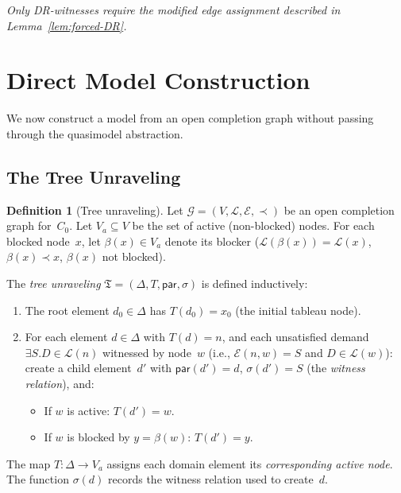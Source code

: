 \documentclass[a4paper,11pt]{article}
\theoremstyle{definition}
\newtheorem{definition}[theorem]{Definition}
\begin{document}
\emph{Only DR-witnesses require the modified edge assignment described
in Lemma~\ref{lem:forced-DR}.}


\section{Direct Model Construction}
\label{sec:model-construction}

We now construct a model from an open completion graph without passing
through the quasimodel abstraction.

\subsection{The Tree Unraveling}

\begin{definition}[Tree unraveling]
\label{def:unraveling}
Let $\mathcal{G} = (V, \mathcal{L}, \mathcal{E}, \prec)$ be an open
completion graph for~$C_0$.  Let $V_a \subseteq V$ be the set of
active (non-blocked) nodes.  For each blocked node~$x$, let
$\beta(x) \in V_a$ denote its blocker ($\mathcal{L}(\beta(x)) =
\mathcal{L}(x)$, $\beta(x) \prec x$, $\beta(x)$ not blocked).

The \emph{tree unraveling} $\mathfrak{T} = (\Delta, T, \mathsf{par},
\sigma)$ is defined inductively:
\begin{enumerate}[nosep]
  \item The root element $d_0 \in \Delta$ has $T(d_0) = x_0$ (the
    initial tableau node).
  \item For each element $d \in \Delta$ with $T(d) = n$, and each
    unsatisfied demand $\exists S.D \in \mathcal{L}(n)$ witnessed by
    node~$w$ (i.e., $\mathcal{E}(n, w) = S$ and $D \in
    \mathcal{L}(w)$): create a child element~$d'$ with
    $\mathsf{par}(d') = d$, $\sigma(d') = S$
    (the \emph{witness relation}), and:
    \begin{itemize}[nosep]
      \item If $w$ is active: $T(d') = w$.
      \item If $w$ is blocked by $y = \beta(w)$: $T(d') = y$.
    \end{itemize}
\end{enumerate}
The map $T \colon \Delta \to V_a$ assigns each domain element its
\emph{corresponding active node}.  The function $\sigma(d)$ records
the witness relation used to create~$d$.
\end{definition}
\end{document}
